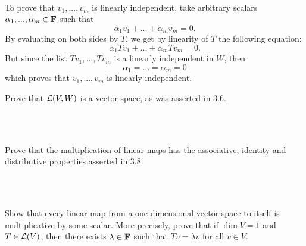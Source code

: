 \begin{solution}
    \\ To prove that $v_1, ..., v_m$ is linearly independent, take arbitrary scalars $\alpha_1, ..., \alpha_m \in \mathbf{F}$ such that
    $$\alpha_1 v_1 + ... + \alpha_m v_m = 0.$$
    By evaluating on both sides by $T$, we get by linearity of $T$ the following equation:
    $$\alpha_1 Tv_1 + ... + \alpha_m Tv_m = 0.$$
    But since the list $Tv_1, ..., Tv_m$ is a linearly independent in $W$, then 
    $$\alpha_1 = ... = \alpha_m = 0$$
    which proves that $v_1, ..., v_m$ is linearly independent. \\
\end{solution}

\begin{exercise}
    Prove that $\mathcal{L}(V, W)$ is a vector space, as was asserted in 3.6. \\
\end{exercise}

\begin{solution}
    \\ \td \\
\end{solution}

\begin{exercise}
    Prove that the multiplication of linear maps has the associative, identity and distributive properties asserted in 3.8. \\
\end{exercise}

\begin{solution}
    \\ \td \\
\end{solution}

\begin{exercise}
    Show that every linear map from a one-dimensional vector space to itself is multiplicative by some scalar. More precisely, prove that if $\dim V = 1$ and $T \in \mathcal{L}(V)$, then there exists $\lambda \in \mathbf{F}$ such that $Tv = \lambda v$ for all $v \in V$. \\
\end{exercise}

\begin{solution}
    \\ \td \\
\end{solution}